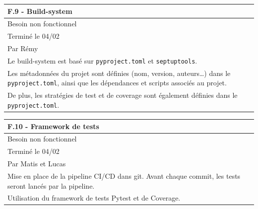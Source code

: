 \documentclass[a4paper,12pt]{article}
\begin{document}
\noindent
\setlength{\arrayrulewidth}{1.5pt}
\renewcommand{\arraystretch}{1.5}
\begin{tabularx}{\textwidth}{|X|}
    \hline
    \textbf{F.9 - Build-system}                                                                                                                                \\
    \hline
    Besoin non fonctionnel                                                                                                                                     \\
    \hline
    Terminé le 04/02                                                                                                                                           \\
    Par Rémy                                                                                                                                                   \\
    \hline
    Le build-system est basé sur \texttt{pyproject.toml} et \texttt{septuptools}.                                                                              \\
    Les métadonnées du projet sont définies (nom, version, auteurs…) dans le \texttt{pyproject.toml}, ainsi que les dépendances et scripts associés au projet. \\
    De plus, les stratégies de test et de coverage sont également définies dans le \texttt{pyproject.toml}.                                                    \\
    \hline
\end{tabularx}

\vspace{1cm}

\noindent
\setlength{\arrayrulewidth}{1.5pt}
\renewcommand{\arraystretch}{1.5}
\begin{tabularx}{\textwidth}{|X|}
    \hline
    \textbf{F.10 - Framework de tests}                            \\
    \hline
    Besoin non fonctionnel                                        \\
    \hline
    Terminé le 04/02                                              \\
    Par Matis et Lucas                                            \\
    \hline
    Mise en place de la pipeline CI/CD dans git.
    Avant chaque commit, les tests seront lancés par la pipeline. \\
    Utilisation du framework de tests Pytest et de Coverage.      \\
    \hline
\end{tabularx}
\end{document}
